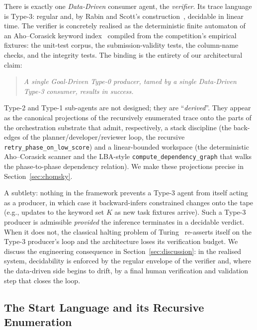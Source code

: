 There is exactly one \emph{Data-Driven} consumer agent, the
\emph{verifier}.  Its trace language is Type-3: regular and, by
Rabin and Scott's construction~\cite{rabin1959finite}, decidable
in linear time.  The verifier is concretely realised as the
deterministic finite automaton of an Aho--Corasick keyword
index~\cite{aho1975corasick} compiled from the competition's
empirical fixtures: the unit-test corpus, the submission-validity
tests, the column-name checks, and the integrity tests. %
The binding is the entirety of our architectural claim:
\begin{quote}
\itshape A single Goal-Driven Type-0 producer, tamed by a single
Data-Driven Type-3 consumer, results in success.
\end{quote}


Type-2 and Type-1 sub-agents are not designed; they are
``\emph{derived}''.  They appear as the canonical projections of the
recursively enumerated trace onto the parts of the orchestration
substrate that admit, respectively, a stack discipline (the
back-edges of the planner/developer/reviewer loop, the
recursive \texttt{retry\_phase\_on\_low\_score}) and a
linear-bounded workspace (the deterministic Aho--Corasick scanner
and the LBA-style \texttt{compute\_dependency\_graph} that walks
the phase-to-phase dependency relation).  We make these
projections precise in Section~\ref{sec:chomsky}.

A subtlety: nothing in the framework prevents a Type-3 agent from
itself acting as a producer, in which case it backward-infers
constrained changes onto the tape (e.g., updates to the keyword
set $K$ as new task fixtures arrive).  Such a Type-3 producer is
admissible \emph{provided} the inference terminates in a
decidable verdict.  When it does not, the classical halting
problem of Turing~\cite{turing1936computable} re-asserts itself
on the Type-3 producer's loop and the architecture loses its
verification budget.  We discuss the engineering consequence in
Section~\ref{sec:discussion}: in the realised system, decidability
is enforced by the regular envelope of the verifier and, where
the data-driven side begins to drift, by a final human
verification and validation step that closes the loop.

\subsection{The Start Language and its Recursive Enumeration}

